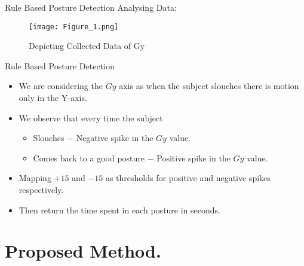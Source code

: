 \documentclass[aspectratio=169,xcolor=dvipsnames]{beamer}
\begin{document}
\begin{frame}{Rule Based Posture Detection}
    Analysing Data:
   \begin{figure}
       \centering
       \texttt{[image: Figure\_1.png]}
       \caption{Depicting Collected Data of Gy}
       \label{fig:piximage}
   \end{figure}
  \end{frame}

\begin{frame}{Rule Based Posture Detection}
    \begin{itemize}
        \item We are considering the $Gy$ axis as when the subject slouches there is motion only in the Y-axis.
        \item We observe that every time the subject
            \begin{itemize}
                \item Slouches $-$ Negative spike in the $Gy$ value.
                \item Comes back to a good posture $-$ Positive spike in the $Gy$ value.
            \end{itemize}
        \item Mapping $+15$ and $-15$ as thresholds for positive and negative spikes respectively.
        \item Then return the time spent in each posture in seconds.
    \end{itemize}
\end{frame}




\section{Proposed Method.}
\end{document}
